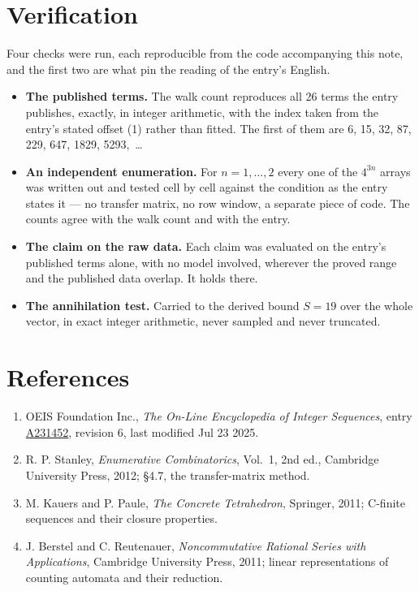 \documentclass[11pt]{article}
\theoremstyle{definition}
\begin{document}
\section{Verification}

Four checks were run, each reproducible from the code accompanying this note, and the first two are what pin the reading of the entry's English.

\begin{itemize}

\item {\bfseries The published terms.} The walk count reproduces all 26 terms the entry publishes, exactly, in integer arithmetic, with the index taken from the entry's stated offset (1) rather than fitted. The first of them are 6, 15, 32, 87, 229, 647, 1829, 5293,~\dots

\item {\bfseries An independent enumeration.} For $n = 1,\dots,2$ every one of the $4^{3n}$ arrays was written out and tested cell by cell against the condition as the entry states it --- no transfer matrix, no row window, a separate piece of code. The counts agree with the walk count and with the entry.

\item {\bfseries The claim on the raw data.} Each claim was evaluated on the entry's published terms alone, with no model involved, wherever the proved range and the published data overlap. It holds there.

\item {\bfseries The annihilation test.} Carried to the derived bound $S = 19$ over the whole vector, in exact integer arithmetic, never sampled and never truncated.

\end{itemize}

\section{References}

\begin{enumerate}

\item OEIS Foundation Inc., \emph{The On-Line Encyclopedia of Integer Sequences}, entry \href{https://oeis.org/A231452}{A231452}, revision 6, last modified Jul 23 2025.

\item R. P. Stanley, \emph{Enumerative Combinatorics}, Vol.~1, 2nd ed., Cambridge University Press, 2012; \S4.7, the transfer-matrix method.

\item M. Kauers and P. Paule, \emph{The Concrete Tetrahedron}, Springer, 2011; C-finite sequences and their closure properties.

\item J. Berstel and C. Reutenauer, \emph{Noncommutative Rational Series with Applications}, Cambridge University Press, 2011; linear representations of counting automata and their reduction.

\end{enumerate}
\end{document}
